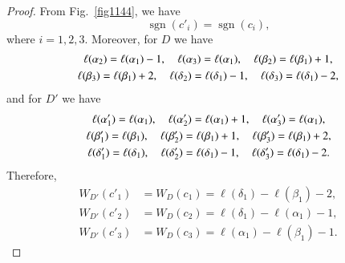 \documentclass[10pt,a4paper]{amsart}
\numberwithin{equation}{section}
\numberwithin{equation}{section}
\begin{document}
\begin{proof}
	From Fig.~\ref{fig1144}, we have 
	\begin{equation}
		\operatorname{sgn}(c'_i)=\operatorname{sgn}(c_i), \label{2.2}
	\end{equation}
	where $i=1,2,3$. Moreover, for $D$ we have 
	$$
	\begin{gathered}
		\ell(\alpha_2)=\ell(\alpha_1)-1, \quad \ell(\alpha_3)=\ell(\alpha_1), \quad 
		\ell(\beta_2)=\ell(\beta_1)+1,  \cr 
		\ell(\beta_3)=\ell(\beta_1)+2, \quad  \ell(\delta_2)=\ell(\delta_1)-1, \quad
		\ell(\delta_3)=\ell(\delta_1)-2, 
	\end{gathered}
	$$
	and for $D'$ we have
	$$
	\begin{gathered}	
		\ell(\alpha'_1)=\ell(\alpha_1), \quad 
		\ell(\alpha'_2)=\ell(\alpha_1)+1, \quad  
		\ell(\alpha'_3)=\ell(\alpha_1), \cr 
		\ell(\beta'_1)=\ell(\beta_1), \quad
		\ell(\beta'_2)=\ell(\beta_1)+1, \quad   
		\ell(\beta'_3)=\ell(\beta_1)+2, \cr
		\ell(\delta'_1)=\ell(\delta_1), \quad 
		\ell(\delta'_2)=\ell(\delta_1)-1, \quad 
		\ell(\delta'_3)=\ell(\delta_1)-2.
	\end{gathered}
	$$
	Therefore,
	\begin{align}
		W_{D'}(c'_1) &= W_D(c_1) = \ell(\delta_1)-\ell(\beta_1)-2, \label{2.3} \\
		W_{D'}(c'_2) &= W_D(c_2) = \ell(\delta_1)-\ell(\alpha_1)-1, \label{2.4} \\
		W_{D'}(c'_3) &= W_D(c_3) = \ell(\alpha_1)-\ell(\beta_1)-1.  \label{2.5} 
	\end{align}
	

\end{proof}
\end{document}
